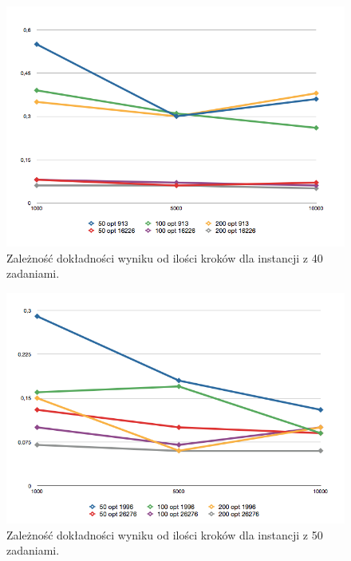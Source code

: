   \begin{figure}[h!]
  \begin{center}
  \caption{Zależność dokładności wyniku od ilości kroków dla instancji z 40 zadaniami.}
  \includegraphics[scale=.6]{images/40.png}
  \end{center}
  \end{figure}

  \begin{figure}[h!]
  \begin{center}
  \caption{Zależność dokładności wyniku od ilości kroków dla instancji z 50 zadaniami.}
  \includegraphics[scale=.6]{images/50.png}
  \end{center}
  \end{figure}

